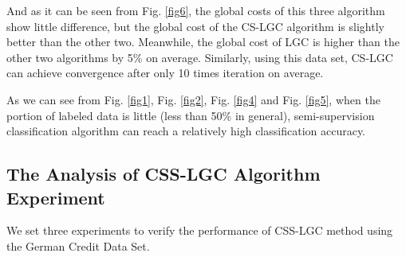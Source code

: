 \documentclass{svjour3}                     %
\begin{document}
And as it can be seen from Fig. \ref{fig6}, the global costs of this three algorithm show little difference, but the global cost of the CS-LGC algorithm is slightly better than the other two. Meanwhile, the global cost of LGC is higher than the other two algorithms by 5\% on average. Similarly, using this data set, CS-LGC can achieve convergence after only 10 times iteration on average.

As we can see from Fig. \ref{fig1}, Fig. \ref{fig2}, Fig. \ref{fig4} and
Fig. \ref{fig5}, when the portion of labeled data is little (less than 50\% in general), semi-supervision classification algorithm can reach a relatively high classification accuracy.

\subsection{The Analysis of CSS-LGC Algorithm Experiment}
We set three experiments to verify the performance of CSS-LGC method using the German Credit Data Set.
\end{document}
